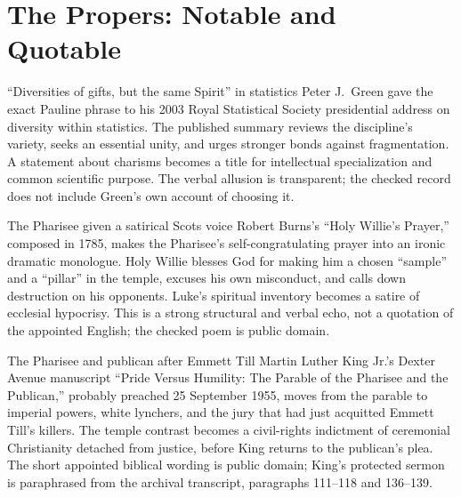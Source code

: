 \sectionguard
\section*{The Propers: Notable and Quotable}

\begin{studybox}{``Diversities of gifts, but the same Spirit'' in statistics}
Peter J.~Green gave the exact Pauline phrase to his 2003 Royal Statistical
Society presidential address on diversity within statistics. The published
summary reviews the discipline's variety, seeks an essential unity, and urges
stronger bonds against fragmentation. A statement about charisms becomes a
title for intellectual specialization and common scientific purpose. The
verbal allusion is transparent; the checked record does not include Green's
own account of choosing it.
\end{studybox}

\begin{studybox}{The Pharisee given a satirical Scots voice}
Robert Burns's ``Holy Willie's Prayer,'' composed in 1785, makes the
Pharisee's self-congratulating prayer into an ironic dramatic monologue. Holy
Willie blesses God for making him a chosen ``sample'' and a ``pillar'' in the
temple, excuses his own misconduct, and calls down destruction on his
opponents. Luke's spiritual inventory becomes a satire of ecclesial hypocrisy.
This is a strong structural and verbal echo, not a quotation of the appointed
English; the checked poem is public domain.
\end{studybox}

\begin{studybox}{The Pharisee and publican after Emmett Till}
Martin Luther King Jr.'s Dexter Avenue manuscript ``Pride Versus Humility: The
Parable of the Pharisee and the Publican,'' probably preached 25 September
1955, moves from the parable to imperial powers, white lynchers, and the jury
that had just acquitted Emmett Till's killers. The temple contrast becomes a
civil-rights indictment of ceremonial Christianity detached from justice,
before King returns to the publican's plea. The short appointed biblical
wording is public domain; King's protected sermon is paraphrased from the
archival transcript, paragraphs 111--118 and 136--139.
\end{studybox}
